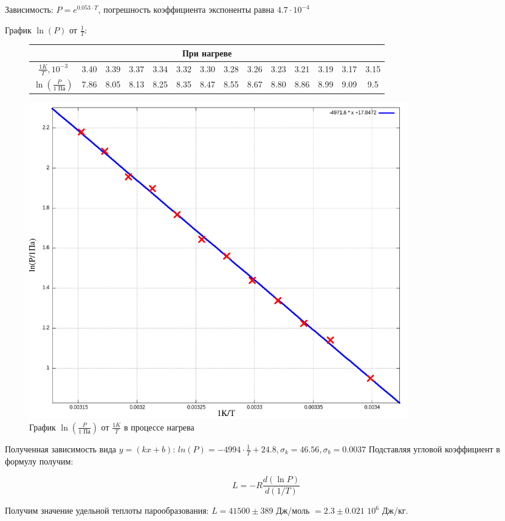 \documentclass[a4paper,10pt]{article} %
\begin{document}
Зависимость: $P = e^{0.053\cdot T}$, погрешность коэффициента экспоненты равна $4.7\cdot 10^{-4}$ 




График $\ln(P)$ от $\frac{1}{T}$:

\begin{figure}[H]
	\centering
	\begin{tabular}{|c|c|c|c|c|c|c|c|c|c|c|c|c|c|}
		\hline
		\multicolumn{14}{|c|}{При нагреве}\\
		\hline
		$\frac{1 K}{T}, 10^{-3}$&3.40&3.39&3.37&3.34&3.32&3.30&3.28&3.26&3.23&3.21&3.19&3.17&3.15\\\hline
		$\ln(\frac{P}{\text{1 Па}})$&7.86&8.05&8.13&8.25&8.35&8.47&8.55&8.67&8.80&8.86&8.99&9.09&9.5\\\hline
	\end{tabular}
\end{figure}



\begin{figure}[H]
	\centering
	\includegraphics[width=0.8\textwidth]{2-4-1-2-res.png}
	\caption{График $\ln \left(\frac{P}{\text{1 Па}}\right)$ от $\frac{1K}{T}$ в процессе нагрева}
\end{figure}

Полученная зависимость вида $y = (kx + b)$:
\(ln(P) = -4994\cdot \frac{1}{T} + 24.8, \sigma_k = 46.56,  \sigma_b = 0.0037\)
Подставляя угловой коэффициент в формулу получим:

$$ L = -R\frac{d(\ln P)}{d(1/T)} $$

Получим значение удельной теплоты парообразования: $L = 41500 \pm 389$ Дж/моль $= 2.3 \pm 0.021$ $10^{6}$ Дж/кг.

\medskip
\end{document}
